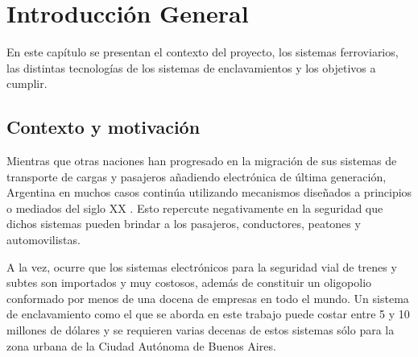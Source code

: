 
\chapter{Introducción General} %

\label{Chapter1} %
\label{IntroGeneral}


\newcommand{\keyword}[1]{\textbf{#1}}
\newcommand{\tabhead}[1]{\textbf{#1}}
\newcommand{\code}[1]{\texttt{#1}}
\newcommand{\file}[1]{\texttt{\bfseries#1}}
\newcommand{\option}[1]{\texttt{\itshape#1}}
\newcommand{\grados}{$^{\circ}$}


En este capítulo se presentan el contexto del proyecto, los sistemas ferroviarios, las distintas tecnologías de los sistemas de enclavamientos y los objetivos a cumplir.

		
	\section{Contexto y motivación}
	
		Mientras que otras naciones han progresado en la migración de sus sistemas de transporte de cargas y pasajeros añadiendo electrónica de última generación, Argentina en muchos casos continúa utilizando mecanismos diseñados a principios o mediados del siglo XX \cite{cite0,cite2}. Esto repercute negativamente en la seguridad que dichos sistemas pueden brindar a los pasajeros, conductores, peatones y automovilistas. 
		
		A la vez, ocurre que los sistemas electrónicos para la seguridad vial de trenes y subtes son importados y muy costosos, además de constituir un oligopolio conformado por menos de una docena de empresas en todo el mundo. Un sistema de enclavamiento como el que se aborda en este trabajo puede costar entre 5 y 10 millones de dólares \cite{SIEMENS} y se requieren varias decenas de estos sistemas sólo para la zona urbana de la Ciudad Autónoma de Buenos Aires.
		

